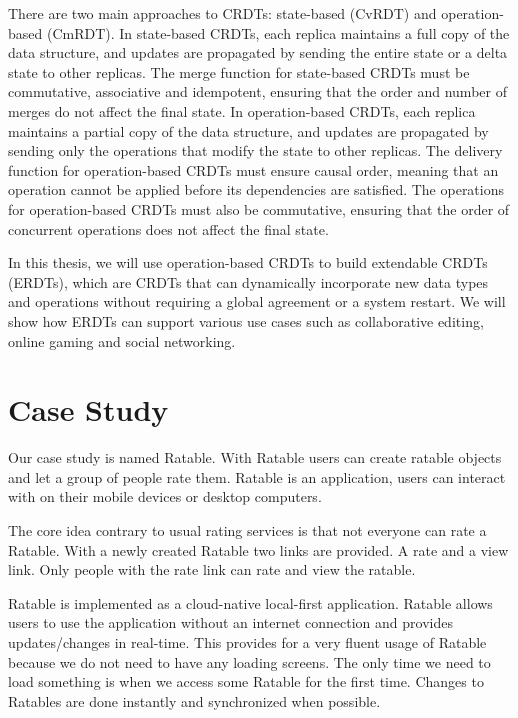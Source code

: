 \documentclass[
	english,
	ruledheaders=section,   %
	class=report,		    %
	thesis={type=bachelor}, %
	accentcolor=9c,			%
	custommargins=true,    %
	marginpar=false,        %
	parskip=half-,          %
	fontsize=11pt,          %
]{tudapub}
\begin{document}
There are two main approaches to CRDTs: state-based (CvRDT) and operation-based (CmRDT). In state-based CRDTs, each replica maintains a full copy of the data structure, and updates are propagated by sending the entire state or a delta state to other replicas. The merge function for state-based CRDTs must be commutative, associative and idempotent, ensuring that the order and number of merges do not affect the final state. In operation-based CRDTs, each replica maintains a partial copy of the data structure, and updates are propagated by sending only the operations that modify the state to other replicas. The delivery function for operation-based CRDTs must ensure causal order, meaning that an operation cannot be applied before its dependencies are satisfied. The operations for operation-based CRDTs must also be commutative, ensuring that the order of concurrent operations does not affect the final state. ~\cite{Shapiro2011ConflictFreeRD}

In this thesis, we will use operation-based CRDTs to build extendable CRDTs (ERDTs), which are CRDTs that can dynamically incorporate new data types and operations without requiring a global agreement or a system restart. We will show how ERDTs can support various use cases such as collaborative editing, online gaming and social networking.

\section{Case Study}
Our case study is named Ratable. With Ratable users can create ratable objects and let a group of people rate them. Ratable is an application, users can interact with on their mobile devices or desktop computers. 

The core idea contrary to usual rating services is that not everyone can rate a Ratable. With a newly created Ratable two links are provided. A rate and a view link. Only people with the rate link can rate and view the ratable.

Ratable is implemented as a cloud-native local-first application. Ratable allows users to use the application without an internet connection and provides updates/changes in real-time. This provides for a very fluent usage of Ratable because we do not need to have any loading screens. The only time we need to load something is when we access some Ratable for the first time. Changes to Ratables are done instantly and synchronized when possible.
\end{document}
